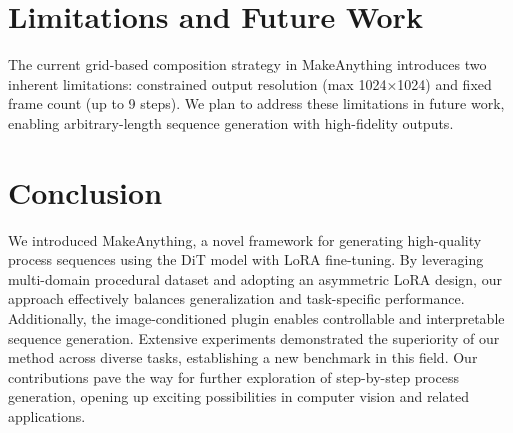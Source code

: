 \section{Limitations and Future Work}
The current grid-based composition strategy in MakeAnything introduces two inherent limitations: constrained output resolution (max 1024×1024) and fixed frame count (up to 9 steps). We plan to address these limitations in future work, enabling arbitrary-length sequence generation with high-fidelity outputs.


\section{Conclusion}
We introduced MakeAnything, a novel framework for generating high-quality process sequences using the DiT model with LoRA fine-tuning. By leveraging multi-domain procedural dataset and adopting an asymmetric LoRA design, our approach effectively balances generalization and task-specific performance. Additionally, the image-conditioned plugin enables controllable and interpretable sequence generation. Extensive experiments demonstrated the superiority of our method across diverse tasks, establishing a new benchmark in this field. Our contributions pave the way for further exploration of step-by-step process generation, opening up exciting possibilities in computer vision and related applications.

